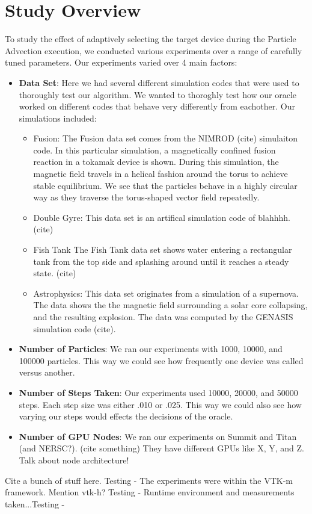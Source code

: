 \documentclass{IEEEtran}
\begin{document}
\section{Study Overview}
To study the effect of adaptively selecting the target device during the Particle Advection execution, we conducted various experiments over a range of carefully tuned parameters.
%
Our experiments varied over 4 main factors:
%
\begin{itemize}
\item \textbf{Data Set}: Here we had several different simulation codes that were used to thoroughly test our algorithm. We wanted to thoroghly test how our oracle worked on different codes that behave very differently from eachother. Our simulations included:
%
\begin{itemize}
\item{Fusion}: The Fusion data set comes from the NIMROD (cite) simulaiton code. In this particular simulation, a magnetically confined fusion reaction in a tokamak device is shown. During this simulation, the magnetic field travels in a helical fashion around the torus to achieve stable equilibrium. We see that the particles behave in a highly circular way as they traverse the torus-shaped vector field repeatedly.
\item{Double Gyre}: This data set is an artifical simulation code of blahhhh. (cite)
\item{Fish Tank} The Fish Tank data set shows water entering a rectangular tank from the top side and splashing around until it reaches a steady state. (cite)
\item{Astrophysics}: This data set originates from a simulation of a supernova. The data shows the the magnetic field surrounding a solar core collapsing, and the resulting explosion. The data was computed by the GENASIS simulation code (cite).
\end{itemize}
%
\item \textbf{Number of Particles}: We ran our experiments with 1000, 10000, and 100000 particles. This way we could see how frequently one device was called versus another.
\item \textbf{Number of Steps Taken}: Our experiments used 10000, 20000, and 50000 steps. Each step size was either .010 or .025. This way we could also see how varying our steps would effects the decisions of the oracle.
\item \textbf{Number of GPU Nodes}: We ran our experiments on Summit and Titan (and NERSC?). (cite something) They have different GPUs like X, Y, and Z. Talk about node architecture!
\end{itemize}
%
Cite a bunch of stuff here. Testing - \cite{Camp12}
%
The experiments were within the VTK-m framework. Mention vtk-h? Testing - \cite{Pugmire:SC09}
%
Runtime environment and measurements taken...Testing - \cite{Kress16}
%
\end{document}
